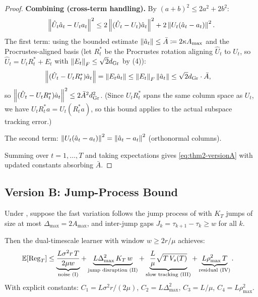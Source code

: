 \begin{proof}
\textbf{Combining (cross-term handling).}
By $(a+b)^2 \leq 2a^2 + 2b^2$:
\[
  \left\|\hat{U}_t\hat{a}_t - U_t a_t\right\|^2
  \leq 2\left\|(\hat{U}_t-U_t)\hat{a}_t\right\|^2
  + 2\left\|U_t(\hat{a}_t - a_t)\right\|^2.
\]
The first term: using the bounded estimate
$\left\|\hat{a}_t\right\| \leq \bar{A} \coloneqq 2\kappa A_{\max}$
and the Procrustes-aligned basis (let $R^*_t$ be the Procrustes
rotation aligning $\hat{U}_t$ to $U_t$, so
$\hat{U}_t = U_t R^*_t + E_t$ with $\left\|E_t\right\|_F \leq \sqrt{2}d_{\mathrm{Gr}}$
by (4)):
\begin{align*}
  \left\|(\hat{U}_t - U_tR^*_t)\hat{a}_t\right\|
  &= \left\|E_t\hat{a}_t\right\|
  \leq \left\|E_t\right\|_F\left\|\hat{a}_t\right\|
  \leq \sqrt{2}d_{\mathrm{Gr}} \cdot \bar{A},
\end{align*}
so $\left\|(\hat{U}_t-U_tR^*_t)\hat{a}_t\right\|^2
\leq 2\bar{A}^2d_{\mathrm{Gr}}^2$. (Since $U_tR^*_t$ spans the same column
space as $U_t$, we have $U_tR^*_t a = U_t(R^*_t a)$, so this
bound applies to the actual subspace tracking error.)

The second term: $\left\|U_t(\hat{a}_t-a_t)\right\|^2 = \left\|\hat{a}_t-a_t\right\|^2$
(orthonormal columns).

Summing over $t = 1, \ldots, T$ and taking expectations gives
\eqref{eq:thm2-versionA} with updated constants absorbing $\bar{A}$.
\end{proof}

\subsection{Version B: Jump-Process Bound}

\begin{theorem}
\label{thm:sufficiency-B}
Under ,
suppose the fast variation follows the jump process of
 with $K_T$ jumps of size at most
$\Delta_{\max} = 2A_{\max}$, and inter-jump gaps
$J_k = \tau_{k+1} - \tau_k \geq w$ for all $k$.

Then the dual-timescale learner with window $w \geq 2r/\mu$ achieves:
\begin{align}
  \mathbb{E}[\mathrm{Reg}_T] &\leq
    \underbrace{\frac{L\sigma^2 r\, T}{2\mu w}}_{\text{noise (I)}}
    + \underbrace{L\Delta_{\max}^2\, K_T\, w}_{\text{jump disruption (II)}}
    + \underbrace{\frac{L}{\mu}\sqrt{T\, V_s(T)}}_{\text{slow tracking (III)}}
    + \underbrace{L\rho_{\max}^2\, T}_{\text{residual (IV)}}.
  \label{eq:thm2-versionB}
\end{align}
With explicit constants: $C_1 = L\sigma^2 r/(2\mu)$,
$C_2 = L\Delta_{\max}^2$, $C_3 = L/\mu$, $C_4 = L\rho_{\max}^2$.
\end{theorem}

